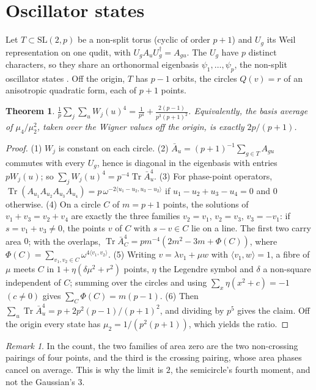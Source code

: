 \documentclass[11pt]{article}
\newtheorem{theorem}{Theorem}
\theoremstyle{remark}
\newtheorem{remark}{Remark}
\newcommand{\Tr}{\operatorname{Tr}}
\begin{document}
\section{Oscillator states}\label{sec:torus}
Let $T\subset\mathrm{SL}(2,p)$ be a non-split torus (cyclic of order $p+1$) and $U_g$ its Weil representation on one
qudit, with $U_gA_uU_g^\dagger=A_{gu}$. The $U_g$ have $p$ distinct characters, so they share an orthonormal eigenbasis
$\psi_1,\dots,\psi_p$, the non-split oscillator states \cite{GHS2008}. Off the origin, $T$ has $p-1$ orbits, the
circles $Q(v)=r$ of an anisotropic quadratic form, each of $p+1$ points.
\begin{theorem}\label{thm:moment}
$\displaystyle\frac1p\sum_j\sum_u W_j(u)^4=\frac1{p^4}+\frac{2(p-1)}{p^3(p+1)^2}$. Equivalently, the basis average of
$\mu_4/\mu_2^2$, taken over the Wigner values off the origin, is exactly $2p/(p+1)$.
\end{theorem}
\begin{proof}
(1) $W_j$ is constant on each circle. (2) $\bar A_u=(p+1)^{-1}\sum_{g\in T}A_{gu}$ commutes with every $U_g$, hence is
diagonal in the eigenbasis with entries $pW_j(u)$; so $\sum_jW_j(u)^4=p^{-4}\Tr\bar A_u^4$. (3) For phase-point
operators, $\Tr(A_{u_1}A_{u_2}A_{u_3}A_{u_4})=p\,\omega^{-2\langle u_1-u_2,u_3-u_2\rangle}$ if $u_1-u_2+u_3-u_4=0$
and $0$ otherwise. (4) On a circle $C$ of $m=p+1$ points, the solutions of $v_1+v_3=v_2+v_4$ are exactly the three
families $v_2=v_1$, $v_2=v_3$, $v_3=-v_1$: if $s=v_1+v_3\ne0$, the points $v$ of $C$ with $s-v\in C$ lie on a line.
The first two carry area $0$; with the overlaps,
$\Tr\bar A_C^4=pm^{-4}(2m^2-3m+\Phi(C))$, where $\Phi(C)=\sum_{v_1,v_2\in C}\omega^{4\langle v_1,v_2\rangle}$.
(5) Writing $v=\lambda v_1+\mu w$ with $\langle v_1,w\rangle=1$, a fibre of $\mu$ meets $C$ in $1+\eta(\delta\mu^2+r^2)$
points, $\eta$ the Legendre symbol and $\delta$ a non-square independent of $C$; summing over the circles and using
$\sum_x\eta(x^2+c)=-1$ $(c\ne0)$ gives $\sum_C\Phi(C)=m(p-1)$. (6) Then
$\sum_u\Tr\bar A_u^4=p+2p^2(p-1)/(p+1)^2$, and dividing by $p^5$ gives the claim. Off the origin every state has
$\mu_2=1/(p^2(p+1))$, which yields the ratio.
\end{proof}
\begin{remark}
In the count, the two families of area zero are the two non-crossing pairings of four points, and the third is the
crossing pairing, whose area phases cancel on average. This is why the limit is $2$, the semicircle's fourth moment,
and not the Gaussian's $3$.
\end{remark}
\end{document}
